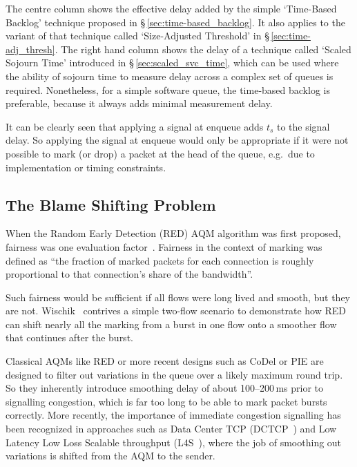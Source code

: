The centre column shows the effective delay added by the simple `Time-Based Backlog' technique proposed in \S\,\ref{sec:time-based_backlog}. It also applies to the variant of that technique called `Size-Adjusted Threshold' in \S\,\ref{sec:time-adj_thresh}. The right hand column shows the delay of a technique called `Scaled Sojourn Time' introduced in \S\,\ref{sec:scaled_svc_time}, which can be used where the ability of sojourn time to measure delay across a complex set of queues is required. Nonetheless, for a simple software queue, the time-based backlog is preferable, because it always adds minimal measurement delay.

It can be clearly seen that applying a signal at enqueue adds \(t_s\) to the signal delay.
So applying the signal at enqueue would only be appropriate if it were not possible to mark (or drop) a packet at the head of the queue, e.g.\ due to implementation or timing constraints.

\subsection{The Blame Shifting Problem}\label{sec:fairer_marking}

When the Random Early Detection (RED) AQM algorithm was first proposed, fairness was one evaluation factor~\cite[\S\,8]{Floyd93:RED}. Fairness in the context of marking was defined as ``the fraction of marked packets for each connection is roughly proportional to that connection’s share of the bandwidth''. 

Such fairness would be sufficient if all flows were long lived and smooth, but they are not.  Wischik~\cite{Wischik99:Mark_Fairly} contrives a simple two-flow scenario to demonstrate how RED can shift nearly all the marking from a burst in one flow onto a smoother flow that continues after the burst. %

Classical AQMs like RED or more recent designs such as CoDel or PIE are designed to filter out variations in the queue over a likely maximum round trip. So they inherently introduce smoothing delay of about 100--200\,ms prior to signalling congestion, which is far too long to be able to mark packet bursts correctly. More recently, the importance of immediate congestion signalling has been recognized in approaches such as Data Center TCP (DCTCP~\cite{Alizadeh10:DCTCP}) and Low Latency Low Loss Scalable throughput (L4S~\cite{Briscoe16a:l4s-arch_ID}), where the job of smoothing out variations is shifted from the AQM to the sender.

